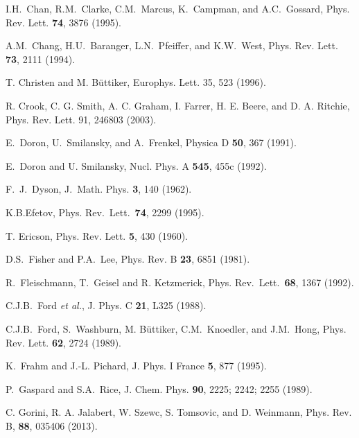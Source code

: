 \documentclass[a4paper,10pt]{article}
\begin{document}
\begin{thebibliography}{Cucc~02b}
I.H.~Chan, R.M.~Clarke,
C.M.~Marcus, K.~Campman, and A.C.~Gossard, Phys. Rev. Lett. {\bf 74},
3876 (1995). 

 A.M.~Chang, H.U.~Baranger, L.N.~Pfeiffer, and
K.W.~West, Phys. Rev. Lett. {\bf 73}, 2111 (1994).

T. Christen and M. B\"uttiker, Europhys. Lett. 35, 523 (1996).

R. Crook, C. G. Smith, A. C. Graham, I. Farrer, H. E. Beere, and
D. A. Ritchie, Phys. Rev. Lett. 91, 246803 (2003).

 E.~Doron, U.~Smilansky, and A.~Frenkel,
 Physica D {\bf 50}, 367 (1991).
 
E.~Doron and U. Smilansky, Nucl. Phys. A {\bf 545}, 455c (1992). 
 
F.~J.~Dyson, J.~Math. Phys. {\bf 3}, 140 (1962).

K.B.Efetov, Phys. Rev.~Lett.~{\bf 74}, 2299 (1995).
 
T. Ericson, Phys. Rev. Lett. {\bf 5}, 430 (1960).

D.S.~Fisher and P.A.~Lee, Phys. Rev. B {\bf 23}, 6851 (1981).

R.~Fleischmann, T.~Geisel and R. Ketzmerick, 
Phys. Rev.~Lett.~{\bf 68}, 1367 (1992).

 C.J.B.~Ford {\em et al.}, J. Phys. C {\bf 21},
L325 (1988).

C.J.B.~Ford, S.~Washburn, M. B\"uttiker, C.M.~Knoedler, 
and J.M.~Hong, Phys. Rev. Lett. {\bf 62}, 2724 (1989).

K.~Frahm and J.-L. Pichard, 
J. Phys. I France {\bf 5}, 877 (1995).

P.~Gaspard and S.A.~Rice, J. Chem. Phys. {\bf 90}, 2225; 2242; 2255 (1989).

C. Gorini, R. A. Jalabert, W. Szewc, S. Tomsovic, and D. Weinmann,
Phys. Rev. B, {\bf 88}, 035406 (2013).


\end{thebibliography}
\end{document}
